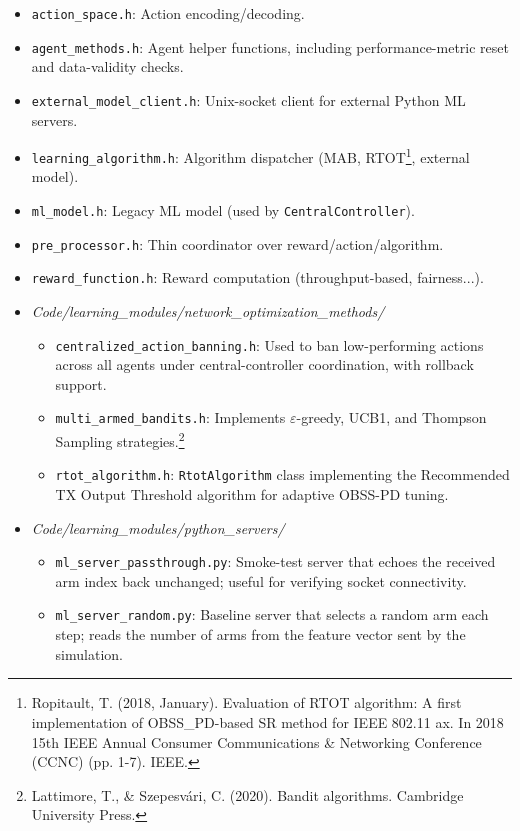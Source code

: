 \documentclass[11pt,a4paper]{article}
\begin{document}
\begin{itemize}
    \item \texttt{action\_space.h}: Action encoding/decoding.
    \item \texttt{agent\_methods.h}: Agent helper functions, including performance-metric reset and data-validity checks.
    \item \texttt{external\_model\_client.h}: Unix-socket client for external Python ML servers.
    \item \texttt{learning\_algorithm.h}: Algorithm dispatcher (MAB, RTOT\footnote{Ropitault, T. (2018, January). Evaluation of RTOT algorithm: A first implementation of OBSS\_PD-based SR method for IEEE 802.11 ax. In 2018 15th IEEE Annual Consumer Communications \& Networking Conference (CCNC) (pp. 1-7). IEEE.}, external model).
    \item \texttt{ml\_model.h}: Legacy ML model (used by \texttt{CentralController}).
    \item \texttt{pre\_processor.h}: Thin coordinator over reward/action/algorithm.
    \item \texttt{reward\_function.h}: Reward computation (throughput-based, fairness...).
    \item \textit{Code/learning\_modules/network\_optimization\_methods/}
    \begin{itemize}
        \item \texttt{centralized\_action\_banning.h}: Used to ban low-performing actions across all agents under central-controller coordination, with rollback support.
        \item \texttt{multi\_armed\_bandits.h}: Implements $\varepsilon$-greedy, UCB1, and Thompson Sampling strategies.\footnote{Lattimore, T., \& Szepesvári, C. (2020). Bandit algorithms. Cambridge University Press.}
        \item \texttt{rtot\_algorithm.h}: \texttt{RtotAlgorithm} class implementing the Recommended TX Output Threshold algorithm for adaptive OBSS-PD tuning.
    \end{itemize}
    \item \textit{Code/learning\_modules/python\_servers/}
    \begin{itemize}
        \item \texttt{ml\_server\_passthrough.py}: Smoke-test server that echoes the received arm index back unchanged; useful for verifying socket connectivity.
        \item \texttt{ml\_server\_random.py}: Baseline server that selects a random arm each step; reads the number of arms from the feature vector sent by the simulation.

\end{itemize}
\end{itemize}
\end{document}
